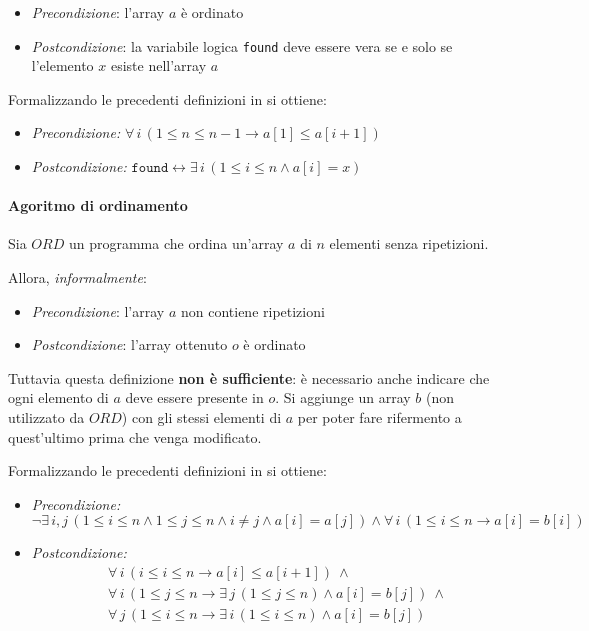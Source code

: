 \documentclass[italian, 10pt]{article}
\begin{document}
\begin{itemize}
  \item \textit{Precondizione}: l'array \(a\) è ordinato
  \item \textit{Postcondizione}: la variabile logica \texttt{found} deve essere vera se e solo se l'elemento \(x\) esiste nell'array \(a\)
\end{itemize}

Formalizzando le precedenti definizioni in \FOL si ottiene:

\begin{itemize}
  \item \textit{Precondizione:} \(\forall \, i \, (1 \leq n \leq n-1 \rightarrow a[1] \leq a[i+1])\)
  \item \textit{Postcondizione:} \(\texttt{found} \leftrightarrow \exists \, i \, (1 \leq i \leq n \land a[i] = x)\)
\end{itemize}

\paragraph{Agoritmo di ordinamento}

Sia \(ORD\) un programma che ordina un'array \(a\) di \(n\) elementi senza ripetizioni.

Allora, \textit{informalmente}:

\begin{itemize}
  \item \textit{Precondizione}: l'array \(a\) non contiene ripetizioni
  \item \textit{Postcondizione}: l'array ottenuto \(o\) è ordinato
\end{itemize}

Tuttavia questa definizione \textbf{non è sufficiente}: è necessario anche indicare che ogni elemento di \(a\) deve essere presente in \(o\).
Si aggiunge un array \(b\) (non utilizzato da \(ORD\)) con gli stessi elementi di \(a\) per poter fare rifermento a quest'ultimo prima che venga modificato.

Formalizzando le precedenti definizioni in \FOL si ottiene:

\begin{itemize}
  \item \textit{Precondizione:} \[\lnot \exists \, i, j \, (1 \leq i \leq n \land 1 \leq j \leq n \land i \neq j \land a[i] = a[j]) \land \forall \, i \, (1 \leq i \leq n \rightarrow a[i] = b[i])\]
  \item \textit{Postcondizione:}
        \begin{align*}
           & \forall \, i \, (i \leq i \leq n \rightarrow a[i] \leq a[i+1]) \ \land                                    \\
           & \forall \, i \, (1 \leq j \leq n \rightarrow \exists \, j \, (1 \leq j \leq n) \land a[i] = b[j]) \ \land \\
           & \forall \, j \, (1 \leq i \leq n \rightarrow \exists \, i \, (1 \leq i \leq n) \land a[i] = b[j])
        \end{align*}
\end{itemize}
\end{document}
